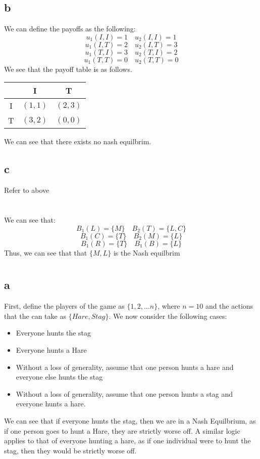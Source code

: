 \documentclass[11pt]{article}
\begin{document}
\subsection*{b}
We can define the payoffs as the following:
\[
u_1(I,I) = 1 \quad u_2(I, I) = 1
\]
\[
u_1(I, T) = 2 \quad u_2(I,T) = 3
\]
\[
u_1(T, I) = 3 \quad u_2(T, I) = 2
\]
\[
u_1(T,T) = 0 \quad u_2(T, T) = 0
\]
We see that the payoff table is as follows.
\begin{table}[H]
    \centering 
    \begin{tabular}{c|c|c}
        & I & T\\
        \hline
        I & $(1,1)$ & $(2,3)$\\
        T & $(3,2)$ & $(0,0)$ 
    \end{tabular}
\end{table}
\noindent We can see that there exists no nash equilbrim. 
\subsection*{c}
Refer to above
\section{}
We can see that:
\[
B_1(L) = \{M\} \quad B_2(T) = \{L, C\}
\]
\[
B_1(C) = \{ T \} \quad B_2(M) = \{L\}
\]
\[
B_1(R) = \{T\} \quad B_1(B) = \{L\}
\]
Thus, we can see that that $\{M, L\}$ is the Nash equilbrim 
\section{}
\subsection*{a}
First, define the players of the game as $\{1, 2, \dots n\}$, where $n = 10$ and the actions that the can take as $\{Hare, Stag\}$. We now consider the following cases:
\begin{itemize}
    \item Everyone hunts the stag 
    \item Everyone hunts a Hare
    \item Without a loss of generality, assume that one person hunts a hare and everyone else hunts the stag
    \item Without a loss of generality, assume that one person hunts a stag and everyone hunts a hare. 
\end{itemize}
We can see that if everyone hunts the stag, then we are in a Nash Equilbrium, as if one person goes to hunt a Hare, they are strictly worse off. A similar logic applies to that of everyone hunting a hare, as if one individual were to hunt the stag, then they would be strictly worse off. 
\end{document}
